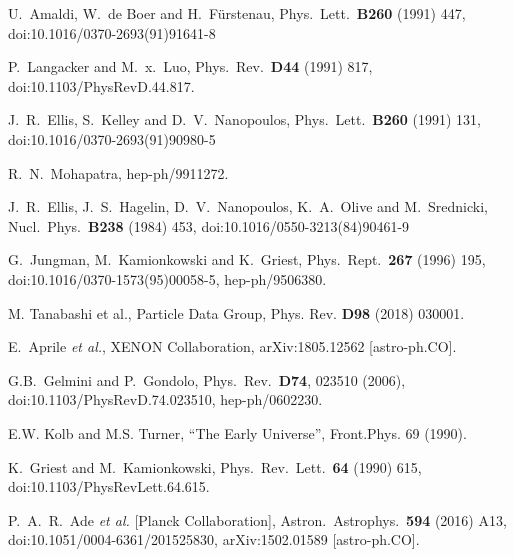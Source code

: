 \documentclass[a4paper,11pt]{article}
\begin{document}
\begin{thebibliography}{99}

 U.~Amaldi, W.~de Boer and H.~F\"urstenau,
  Phys.\ Lett.\ {\bf B260} (1991) 447,
doi:10.1016/0370-2693(91)91641-8

P.~Langacker and M.~x.~Luo,
Phys.\ Rev.\ {\bf D44} (1991) 817,
doi:10.1103/PhysRevD.44.817.

J.~R.~Ellis, S.~Kelley and D.~V.~Nanopoulos,
Phys.\ Lett.\ {\bf B260} (1991) 131,
doi:10.1016/0370-2693(91)90980-5

R.~N.~Mohapatra,
hep-ph/9911272.

J.~R.~Ellis, J.~S.~Hagelin, D.~V.~Nanopoulos, K.~A.~Olive and M.~Srednicki,
Nucl.\ Phys.\ {\bf B238} (1984) 453,
doi:10.1016/0550-3213(84)90461-9

G.~Jungman, M.~Kamionkowski and K.~Griest,
Phys.\ Rept.\  {\bf 267} (1996) 195,
doi:10.1016/0370-1573(95)00058-5,
hep-ph/9506380.

M. Tanabashi et al., Particle Data Group, Phys. Rev. {\bf D98} (2018) 030001.

E.~Aprile {\it et al.}, XENON Collaboration,
arXiv:1805.12562 [astro-ph.CO].

  G.B.~Gelmini and P.~Gondolo,
  Phys.\ Rev.\ {\bf D74}, 023510 (2006),
 doi:10.1103/PhysRevD.74.023510,
hep-ph/0602230.

E.W. Kolb and M.S. Turner, ``The Early Universe'', Front.Phys. 69 (1990).

K.~Griest and M.~Kamionkowski,
Phys.\ Rev.\ Lett.\  {\bf 64} (1990) 615,
doi:10.1103/PhysRevLett.64.615.

P.~A.~R.~Ade {\it et al.} [Planck Collaboration],
Astron.\ Astrophys.\  {\bf 594} (2016) A13, 
doi:10.1051/0004-6361/201525830,
arXiv:1502.01589 [astro-ph.CO].


\end{thebibliography}
\end{document}

